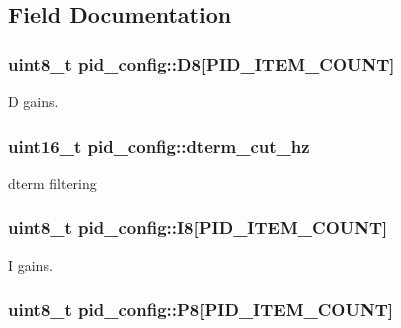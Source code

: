 \subsection{Field Documentation}
\hypertarget{structpid__config_a331e0c9deffb1365963cd65a3deeb0e0}{
\subsubsection[{D8}]{\setlength{\rightskip}{0pt plus 5cm}uint8\+\_\+t pid\+\_\+config\+::\+D8\mbox{[}{\bf P\+I\+D\+\_\+\+I\+T\+E\+M\+\_\+\+C\+O\+U\+N\+T}\mbox{]}}}\label{structpid__config_a331e0c9deffb1365963cd65a3deeb0e0}


D gains. 

\hypertarget{structpid__config_a31d6b30a82800e72d3200d84db1e8dbf}{
\subsubsection[{dterm\+\_\+cut\+\_\+hz}]{\setlength{\rightskip}{0pt plus 5cm}uint16\+\_\+t pid\+\_\+config\+::dterm\+\_\+cut\+\_\+hz}}\label{structpid__config_a31d6b30a82800e72d3200d84db1e8dbf}


dterm filtering 

\hypertarget{structpid__config_afb992939050d08afffe720be88256eaa}{
\subsubsection[{I8}]{\setlength{\rightskip}{0pt plus 5cm}uint8\+\_\+t pid\+\_\+config\+::\+I8\mbox{[}{\bf P\+I\+D\+\_\+\+I\+T\+E\+M\+\_\+\+C\+O\+U\+N\+T}\mbox{]}}}\label{structpid__config_afb992939050d08afffe720be88256eaa}


I gains. 

\hypertarget{structpid__config_a335799c21d07e812af9b4c50ccb7ccb5}{
\subsubsection[{P8}]{\setlength{\rightskip}{0pt plus 5cm}uint8\+\_\+t pid\+\_\+config\+::\+P8\mbox{[}{\bf P\+I\+D\+\_\+\+I\+T\+E\+M\+\_\+\+C\+O\+U\+N\+T}\mbox{]}}}\label{structpid__config_a335799c21d07e812af9b4c50ccb7ccb5}


